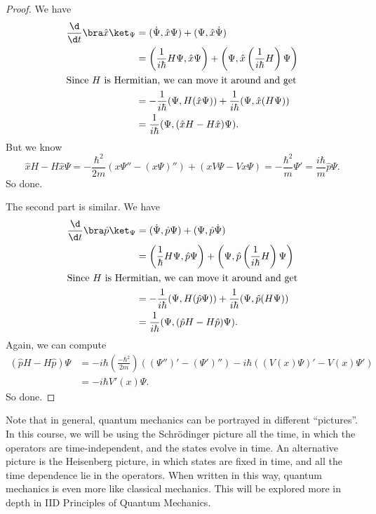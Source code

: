 \documentclass[a4paper]{article}
\begin{document}
\begin{proof}
  We have
  \begin{align*}
    \frac{\d}{\d t}\bra \hat{x}\ket_\Psi &= (\dot{\Psi}, \hat{x}\Psi) + (\Psi, \hat{x}\dot{\Psi})\\
    &= \left(\frac{1}{i\hbar}H\Psi, \hat{x}\Psi\right) + \left(\Psi, \hat{x}\left(\frac{1}{i\hbar}H\right)\Psi\right)\\
    \intertext{Since $H$ is Hermitian, we can move it around and get}
    &= -\frac{1}{i\hbar}(\Psi, H(\hat{x}\Psi)) + \frac{1}{i\hbar}(\Psi, \hat{x}(H\Psi))\\
    &= \frac{1}{i\hbar}(\Psi, (\hat{x} H - H\hat{x}) \Psi).
  \end{align*}
  But we know
  \[
    \hat{x}H - H\hat{x}\Psi = -\frac{\hbar^2}{2m}(x\Psi'' - (x\Psi)'') + (xV\Psi - Vx\Psi) = -\frac{\hbar^2}{m}\Psi' = \frac{i\hbar}{m}\hat{p}\Psi.
  \]
  So done.

  The second part is similar. We have
  \begin{align*}
    \frac{\d}{\d t}\bra \hat{p}\ket_\Psi &= (\dot{\Psi}, \hat{p}\Psi) + (\Psi, \hat{p}\dot{\Psi})\\
    &= \left(\frac{1}{\hbar}H\Psi, \hat{p}\Psi\right) + \left(\Psi, \hat{p}\left(\frac{1}{i\hbar}H\right)\Psi\right)\\
    \intertext{Since $H$ is Hermitian, we can move it around and get}
    &= -\frac{1}{i\hbar}(\Psi, H(\hat{p}\Psi)) + \frac{1}{i\hbar}(\Psi, \hat{p}(H\Psi))\\
    &= \frac{1}{i\hbar}(\Psi, (\hat{p} H - H\hat{p}) \Psi).
  \end{align*}
  Again, we can compute
  \begin{align*}
    (\hat{p}H - H\hat{p})\Psi &= -i\hbar \left(\frac{-\hbar^2}{2m}\right)((\Psi'')' - (\Psi')'') - i\hbar ((V(x)\Psi)' - V(x) \Psi') \\
    &= -i\hbar V'(x) \Psi.
  \end{align*}
  So done.
\end{proof}

Note that in general, quantum mechanics can be portrayed in different ``pictures''. In this course, we will be using the Schr\"odinger picture all the time, in which the operators are time-independent, and the states evolve in time. An alternative picture is the Heisenberg picture, in which states are fixed in time, and all the time dependence lie in the operators. When written in this way, quantum mechanics is even more like classical mechanics. This will be explored more in depth in IID Principles of Quantum Mechanics.
\end{document}
